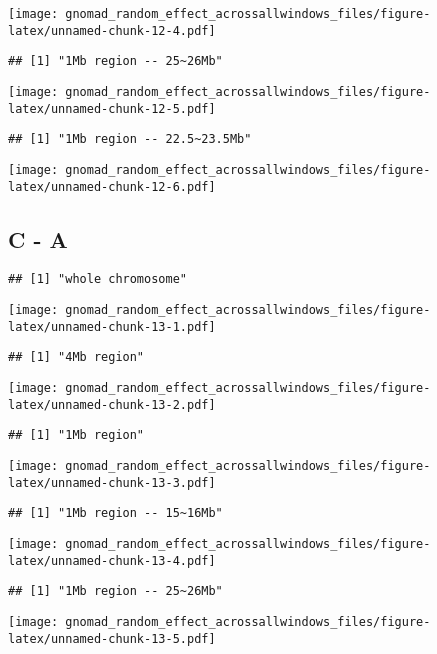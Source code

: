 \documentclass[
]{article}
\begin{document}
\texttt{[image: gnomad\_random\_effect\_acrossallwindows\_files/figure-latex/unnamed-chunk-12-4.pdf]}

\begin{verbatim}
## [1] "1Mb region -- 25~26Mb"
\end{verbatim}

\texttt{[image: gnomad\_random\_effect\_acrossallwindows\_files/figure-latex/unnamed-chunk-12-5.pdf]}

\begin{verbatim}
## [1] "1Mb region -- 22.5~23.5Mb"
\end{verbatim}

\texttt{[image: gnomad\_random\_effect\_acrossallwindows\_files/figure-latex/unnamed-chunk-12-6.pdf]}

\hypertarget{c---a-1}{%
\subsection{C - A}\label{c---a-1}}

\begin{verbatim}
## [1] "whole chromosome"
\end{verbatim}

\texttt{[image: gnomad\_random\_effect\_acrossallwindows\_files/figure-latex/unnamed-chunk-13-1.pdf]}

\begin{verbatim}
## [1] "4Mb region"
\end{verbatim}

\texttt{[image: gnomad\_random\_effect\_acrossallwindows\_files/figure-latex/unnamed-chunk-13-2.pdf]}

\begin{verbatim}
## [1] "1Mb region"
\end{verbatim}

\texttt{[image: gnomad\_random\_effect\_acrossallwindows\_files/figure-latex/unnamed-chunk-13-3.pdf]}

\begin{verbatim}
## [1] "1Mb region -- 15~16Mb"
\end{verbatim}

\texttt{[image: gnomad\_random\_effect\_acrossallwindows\_files/figure-latex/unnamed-chunk-13-4.pdf]}

\begin{verbatim}
## [1] "1Mb region -- 25~26Mb"
\end{verbatim}

\texttt{[image: gnomad\_random\_effect\_acrossallwindows\_files/figure-latex/unnamed-chunk-13-5.pdf]}
\end{document}
